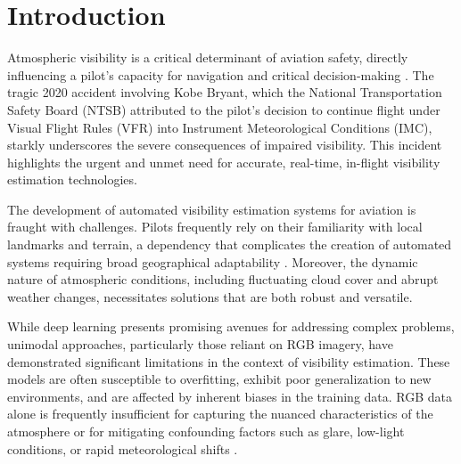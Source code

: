 \section{Introduction}
\label{sec:introduction}

Atmospheric visibility is a critical determinant of aviation safety, directly influencing a pilot's capacity for navigation and critical decision-making \cite{visibilitybook, Kulesa2003WEATHERAA, fultz2016fatal, long2022analysis, fujita1977analysis, ramee2021analysis}. The tragic 2020 accident involving Kobe Bryant, which the National Transportation Safety Board (NTSB) attributed to the pilot's decision to continue flight under Visual Flight Rules (VFR) into Instrument Meteorological Conditions (IMC), starkly underscores the severe consequences of impaired visibility. This incident highlights the urgent and unmet need for accurate, real-time, in-flight visibility estimation technologies.

The development of automated visibility estimation systems for aviation is fraught with challenges. Pilots frequently rely on their familiarity with local landmarks and terrain, a dependency that complicates the creation of automated systems requiring broad geographical adaptability \cite{ahlstrom2019assessments}. Moreover, the dynamic nature of atmospheric conditions, including fluctuating cloud cover and abrupt weather changes, necessitates solutions that are both robust and versatile.

While deep learning presents promising avenues for addressing complex problems, unimodal approaches, particularly those reliant on RGB imagery, have demonstrated significant limitations in the context of visibility estimation. These models are often susceptible to overfitting, exhibit poor generalization to new environments, and are affected by inherent biases in the training data. RGB data alone is frequently insufficient for capturing the nuanced characteristics of the atmosphere or for mitigating confounding factors such as glare, low-light conditions, or rapid meteorological shifts \cite{Bouhsine2022, AitOuadil2023, li_meteorological_2017, chaabani_estimating_2018, palvanov_dhcnn_2018, choi_automatic_2018, you_relative_2019, li_method_2019, outay_estimating_2021}.

